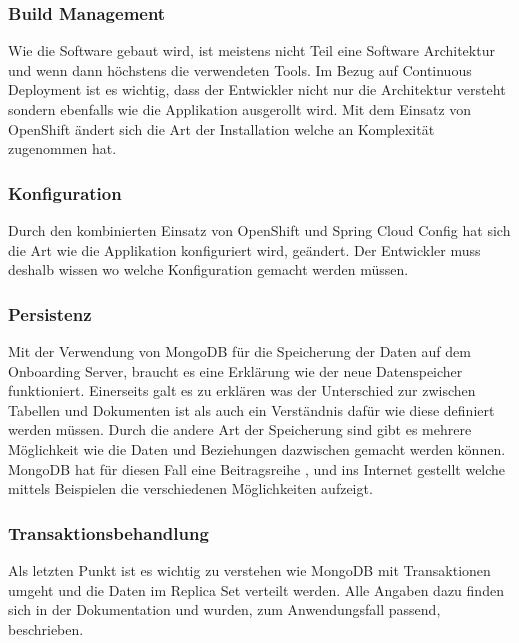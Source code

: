 \subsubsection{Build Management}

Wie die Software gebaut wird, ist meistens nicht Teil eine Software Architektur und wenn dann höchstens die verwendeten Tools. Im Bezug auf Continuous Deployment ist es wichtig, dass der Entwickler nicht nur die Architektur versteht sondern ebenfalls wie die Applikation ausgerollt wird. Mit dem Einsatz von OpenShift ändert sich die Art der Installation welche an Komplexität zugenommen hat.

\subsubsection{Konfiguration}

Durch den kombinierten Einsatz von OpenShift und Spring Cloud Config hat sich die Art wie die Applikation konfiguriert wird, geändert. Der Entwickler muss deshalb wissen wo welche Konfiguration gemacht werden müssen.

\subsubsection{Persistenz}

Mit der Verwendung von MongoDB für die Speicherung der Daten auf dem Onboarding Server, braucht es eine Erklärung wie der neue Datenspeicher funktioniert. Einerseits galt es zu erklären was der Unterschied zur zwischen Tabellen und Dokumenten ist als auch ein Verständnis dafür wie diese definiert werden müssen. Durch die andere Art der Speicherung sind gibt es mehrere Möglichkeit wie die Daten und Beziehungen dazwischen gemacht werden können. MongoDB hat für diesen Fall eine Beitragsreihe \cite{mongoschema1}, \cite{mongoschema2} und \cite{mongoschema3} ins Internet gestellt welche mittels Beispielen die verschiedenen Möglichkeiten aufzeigt.

\subsubsection{Transaktionsbehandlung}

Als letzten Punkt ist es wichtig zu verstehen wie MongoDB mit Transaktionen umgeht und die Daten im Replica Set verteilt werden. Alle Angaben dazu finden sich in der Dokumentation \cite{wirteconcern} und wurden, zum Anwendungsfall passend, beschrieben.

